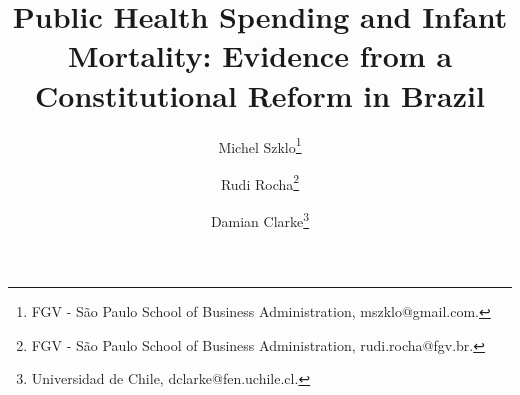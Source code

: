 \documentclass[12pt, final]{article}
\begin{document}
\title{\textbf{Public Health Spending and Infant Mortality: Evidence from a Constitutional Reform in Brazil}}

\author{
\small{Michel Szklo}\footnote{FGV - S\~ao Paulo School of Business Administration, mszklo@gmail.com.}
\and \small{Rudi Rocha}\footnote{FGV - S\~ao Paulo School of Business Administration, rudi.rocha@fgv.br.}
\and \small{Damian Clarke}\footnote{Universidad de Chile, dclarke@fen.uchile.cl.}}
\date{}
\maketitle
\begin{center}
\end{center}
\singlespacing


\newpage
\setcounter{page}{1}









% 

\pagebreak
\singlespacing  


\nocite{}





\pagebreak
\appendix




\singlespacing	
% 
\end{document}
